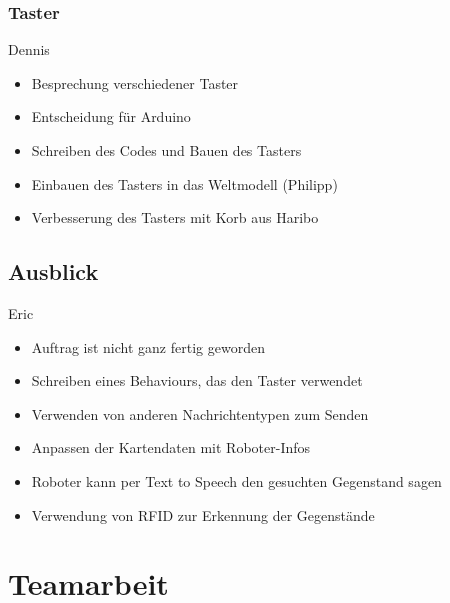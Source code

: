 \documentclass[a4paper,12pt,headsepline]{scrartcl}
\begin{document}
			\subsubsection{Taster}
			Dennis\\
			\begin{itemize}
				\item Besprechung verschiedener Taster
				\item Entscheidung für Arduino
				\item Schreiben des Codes und Bauen des Tasters
				\item Einbauen des Tasters in das Weltmodell (Philipp)
				\item Verbesserung des Tasters mit Korb aus Haribo
			\end{itemize}
	
	\subsection{Ausblick}
	Eric \\
	\begin{itemize}
		\item Auftrag ist nicht ganz fertig geworden
		\item Schreiben eines Behaviours, das den Taster verwendet
		\item Verwenden von anderen Nachrichtentypen zum Senden
		\item Anpassen der Kartendaten mit Roboter-Infos
		\item Roboter kann per Text to Speech den gesuchten Gegenstand sagen
		\item Verwendung von RFID zur Erkennung der Gegenstände
	\end{itemize}
	\newpage
	\section{Teamarbeit}
	
\end{document}
